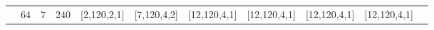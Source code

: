 \begin{table}[]
\begin{threeparttable}
\begin{tabular}{lrrrrrrrrrr }
\rowcolor{Gray}\multirow{-2}{*}{\textbf{CONV15}} &\multirow{-2}{*}{64}&\multirow{-2}{*}{$7$} & \multirow{-2}{*}{$240$}&[\hspace{0.5em}2,\hspace{0.5em}120,\hspace{0.5em}2,\hspace{0.5em}\hspace{0.5em}1] &[\hspace{0.5em}7,\hspace{0.5em}120,\hspace{0.5em}4,\hspace{0.5em}\hspace{0.5em}2] &[12,\hspace{0.5em}120,\hspace{0.5em}4,\hspace{0.5em}\hspace{0.5em}1] &[12,\hspace{0.5em}120,\hspace{0.5em}4,\hspace{0.5em}\hspace{0.5em}1] &[12,\hspace{0.5em}120,\hspace{0.5em}4,\hspace{0.5em}\hspace{0.5em}1] &[12,\hspace{0.5em}120,\hspace{0.5em}4,\hspace{0.5em}\hspace{0.5em}1] \\

\end{tabular}
\end{threeparttable}
\end{table}
